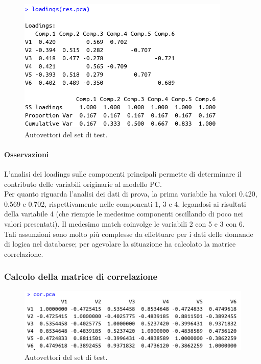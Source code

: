 \begin{figure}[H]
\centering
	\includegraphics[width=0.60\linewidth]{../../PCA/plot/loadings_rete-prova.png}
	\caption{Autovettori del set di test.}
	\label{Autovettori del set di test.}
\end{figure}

\paragraph{Osservazioni}
L'analisi dei loadings sulle componenti principali permette di determinare il contributo delle variabili originarie al modello PC.\\
Per quanto riguarda l'analisi dei dati di prova,  la prima variabile ha valori  0.420, 0.569 e 0.702,  rispettivamente nelle componenti 1, 3 e 4, legandosi ai risultati della variabile 4 (che riempie le medesime componenti oscillando di poco nei valori presentati). Il medesimo match coinvolge le variabili 2 con 5 e 3 con 6.\\
Tali assunzioni sono molto pi\`u complesse da effettuare per  i  dati delle domande di logica nel databaese; per agevolare la situazione ha calcolato la matrice correlazione.

\subsubsection{Calcolo della matrice di correlazione}
\label{Calcolo della matrice di correlazione}

\begin{figure}[H]
\centering
	\includegraphics[width=0.60\linewidth]{../../PCA/plot/correlazione_rete-prova.png}
	\caption{Autovettori del set di test.}
	\label{Autovettori del set di test.}
\end{figure}

